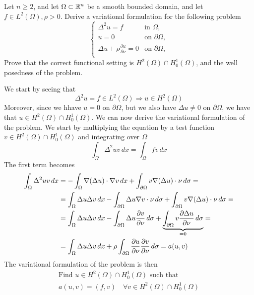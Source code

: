 \newpage
\begin{exercise}
    Let \(n \geq 2\), and let \(\Omega \subset \mathbb{R}^n\) be a smooth bounded domain, and let \(f \in L^2(\Omega), \rho > 0\). Derive a variational formulation for the following problem
    \begin{equation*}
        \begin{cases}
            \Delta^2 u = f & \text{in } \Omega, \\
            u = 0 & \text{on } \partial \Omega, \\
            \Delta u + \rho \frac{\partial u}{\partial \nu} = 0 & \text{on } \partial \Omega, \\
        \end{cases}
    \end{equation*}
    Prove that the correct functional setting is \(H^2(\Omega) \cap H^1_0(\Omega)\), and the well posedness of the problem.
\end{exercise}
We start by seeing that 
    \[
     \Delta^2 u = f \in L^2(\Omega) \Rightarrow u \in H^2(\Omega)
    \]
Moreover, since we hhave \(u = 0\) on \(\partial \Omega\), but we also have \(\Delta u \neq 0\) on \(\partial \Omega\), we have that \(u \in H^2(\Omega) \cap H^1_0(\Omega)\). We can now derive the variational formulation of the problem. We start by multiplying the equation by a test function \(v \in H^2(\Omega) \cap H^1_0(\Omega)\) and integrating over \(\Omega\)
\[
    \int_\Omega \Delta^2 u v \, dx = \int_\Omega f v \, dx
\]
The first term becomes
\begin{align*}
    \int_\Omega \Delta^2 u v \, dx &= - \int_\Omega \nabla(\Delta u) \cdot \nabla v \, dx + \int_{\partial \Omega} v \nabla(\Delta u) \cdot \nu \, d\sigma = \\
    &= \int_\Omega \Delta u \Delta v \, dx - \int_{\partial \Omega} \Delta u \nabla v \cdot \nu \, d\sigma + \int_{\partial \Omega} v \nabla(\Delta u) \cdot \nu \, d\sigma = \\
    &= \int_\Omega \Delta u \Delta v \, dx - \int_{\partial \Omega} \Delta u \frac{\partial v}{\partial \nu} \, d\sigma + \underbrace{\int_{\partial \Omega} v \frac{\partial \Delta u}{\partial \nu} \, d\sigma}_{=0} = \\
    &= \int_\Omega \Delta u \Delta v \, dx + \rho \int_{\partial \Omega} \frac{\partial u}{\partial \nu} \frac{\partial v}{\partial \nu} \, d\sigma = a(u, v)
\end{align*}
The variational formulation of the problem is then
\[
    \begin{split}
        \text{Find } u \in H^2(\Omega) \cap H^1_0(\Omega) \text{ such that } \\
        a(u, v) = (f, v) \quad \forall v \in H^2(\Omega) \cap H^1_0(\Omega)
    \end{split}
\]

